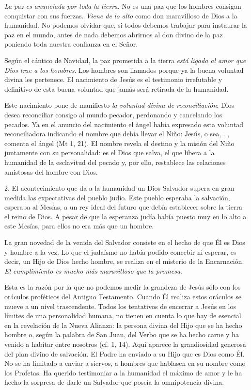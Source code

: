 \begin{body}
\begin{body}
\emph{La paz es anunciada por toda la tierra}. No es una paz que los hombres consigan conquistar con sus fuerzas. \emph{Viene de lo alto} como don maravilloso de Dios a la humanidad. No podemos olvidar que, si todos debemos trabajar para instaurar la paz en el mundo, antes de nada debemos abrirnos al don divino de la paz poniendo toda nuestra confianza en el Señor.

Según el cántico de Navidad, la paz prometida a la tierra \emph{está ligada al amor que Dios trae a los hombres}. Los hombres son llamados  porque ya la buena voluntad divina les pertenece. El nacimiento de Jesús es el testimonio irrefutable y definitivo de esta buena voluntad que jamás será retirada de la humanidad.

Este nacimiento pone de manifiesto \emph{la voluntad divina de reconciliación}: Dios desea reconciliar consigo al mundo pecador, perdonando y cancelando los pecados. Ya en el anuncio del nacimiento el ángel había expresado esta voluntad reconciliadora indicando el nombre que debía llevar el Niño: Jesús, o sea, . , comenta el ángel (Mt 1, 21). El nombre revela el destino y la misión del Niño juntamente con su personalidad: es el Dios que salva, el que libera a la humanidad de la esclavitud del pecado y, por ello, restablece las relaciones amistosas del hombre con Dios.

2. El acontecimiento que da a la humanidad un Dios Salvador supera en gran medida las expectativas del pueblo judío. Este pueblo esperaba la salvación, esperaba al Mesías, a un rey ideal del futuro que debía establecer sobre la tierra el reino de Dios. A pesar de que la esperanza judía había puesto muy en lo alto a este Mesías, para ellos no era más que un hombre.

La gran novedad de la venida del Salvador consiste en el hecho de que Él es Dios y hombre a la vez. Lo que el judaísmo no había podido concebir ni esperar, es decir, un Hijo de Dios hecho hombre, se realiza en el misterio de la Encarnación. \emph{El cumplimiento es mucho más maravilloso que la promesa}.

Esta es la razón por la que no podemos medir la grandeza de Jesús sólo con los oráculos proféticos del Antiguo Testamento. Cuando Él realiza estos oráculos se mueve a un nivel trascendente. Todos los tentativos de encerrar a Jesús en los límites de una personalidad humana, no tienen en cuenta lo que hay de esencial en la revelación de la Nueva Alianza: la persona divina del Hijo que se ha hecho hombre o, según la palabra de San Juan, del Verbo que se ha hecho carne y ha venido a habitar entre nosotros (cf. 1, 14). Aquí aparece la grandiosidad generosa del plan divino de salvación. El Padre ha enviado a su Hijo que es Dios como Él. No se ha limitado a enviar a siervos, a hombres que hablasen en su nombre como los Profetas. Ha querido testimoniar a la humanidad el máximo de amor y le ha hecho la sorpresa de darle un Salvador que poseía la omnipotencia divina.


\end{body}
\end{body}
